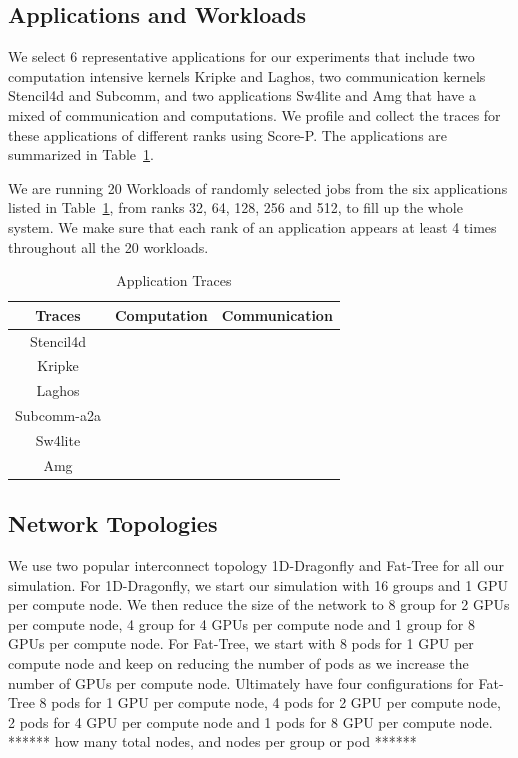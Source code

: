 \documentclass[conference]{IEEEtran}
\newcommand{\xmark}{\ding{55}}%
\newcommand{\cmark}{\ding{51}}%
\begin{document}
\subsection{Applications and Workloads}

We select 6 representative applications for our experiments that include two computation
intensive kernels Kripke and Laghos, two communication kernels Stencil4d and Subcomm, and
two applications Sw4lite and Amg  that have a mixed of communication and computations. 
We profile and collect the traces for these applications of different ranks
using Score-P\cite{b3}. The applications are summarized in Table~\ref{tab1}.

We are running 20 Workloads of randomly selected jobs from the six applications listed
in Table~\ref{tab1}, from ranks 32, 64, 128, 256 and 512, to fill up the whole system.
We make sure that each rank of an application appears at least 4 times throughout all
the 20 workloads.

\begin{table}[htbp]
\caption{Application Traces}
\begin{center}
  \begin{tabular}{|c|c|c|} \hline
\hline
\textbf{Traces} & \textbf{Computation} & \textbf{Communication} \\ \hline
Stencil4d & \xmark & \cmark  \\    \hline
Kripke & \cmark & \xmark  \\    \hline
Laghos & \cmark & \xmark  \\    \hline
Subcomm-a2a & \xmark & \cmark  \\    \hline
Sw4lite & \cmark  & \cmark  \\    \hline
Amg & \cmark  & \cmark  \\    \hline
\end{tabular}
\label{tab1}
\end{center}
\end{table}
  
\subsection{Network Topologies}

We use two popular interconnect topology 1D-Dragonfly and Fat-Tree for all our
simulation\cite{b5}. For 1D-Dragonfly, we start our simulation with 16 groups and
1 GPU per compute node. We then reduce the size of the network to 8 group for
2 GPUs per compute node, 4 group for 4 GPUs per compute node and 1 group for
8 GPUs per compute node. For Fat-Tree, we start with 8 pods for 1 GPU per compute
node  and keep on reducing the number of pods as we increase the number of GPUs
per compute node. Ultimately have four configurations for Fat-Tree 8 pods for 1
GPU per compute node, 4 pods for 2 GPU per compute node, 2 pods for 4 GPU per
compute node and 1 pods for 8 GPU per compute node. ****** how many total nodes, and nodes
per group or pod ******
\end{document}
